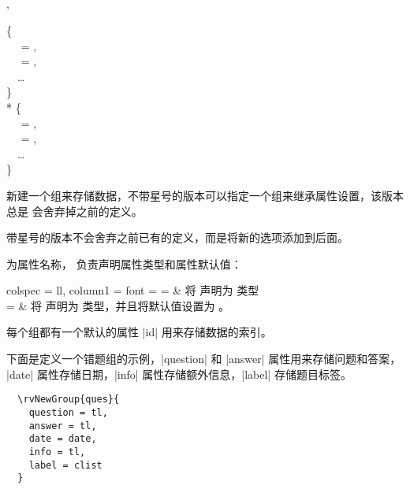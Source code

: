 \documentclass[full]{l3doc}
\begin{document}
\begin{documentation}
\subsection{}
\begin{function}{\rvNewGroup, \rvNewGroup*}
  \begin{syntax}
      \{ \\
    ~~ = , \\
    ~~ = , \\
    ~~\ldots{} \\
    \} \\
    *  \{ \\
    ~~ = , \\
    ~~ = , \\
    ~~\ldots{} \\
    \} \\
  \end{syntax}

\end{function}

  新建一个组来存储数据，不带星号的版本可以指定一个组来继承属性设置，该版本总是
  会舍弃掉之前的定义。

  带星号的版本不会舍弃之前已有的定义，而是将新的选项添加到后面。

   为属性名称， 负责声明属性类型和属性默认值：

  \noindent\begin{tblr}{
    colspec = {ll},
    column{1} = {font = \ttfamily}
  }
     =  &
    将  声明为  类型 \\
     = \textbar{} &
    将  声明为  类型，并且将默认值设置为 。
    \\
  \end{tblr}

  \begin{note}
    每个组都有一个默认的属性 |id| 用来存储数据的索引。
  \end{note}

  下面是定义一个错题组的示例，|question| 和 |answer| 属性用来存储问题和答案，
  |date| 属性存储日期，|info| 属性存储额外信息，|label| 存储题目标签。
\begin{verbatim}
  \rvNewGroup{ques}{
    question = tl,
    answer = tl,
    date = date,
    info = tl,
    label = clist
  }
\end{verbatim}


\end{documentation}
\end{document}
